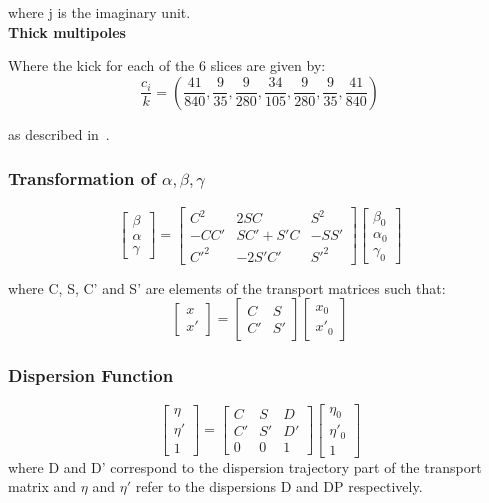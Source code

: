 \documentclass[a4paper]{cernatsnote}
\begin{document}
where j is the imaginary unit.
\\

\textbf{Thick multipoles}

Where the kick for each of the 6 slices are given by:
\[
\frac{c_i}{k} = \left(\frac{41}{840}, \frac{9}{35}, \frac{9}{280},
\frac{34}{105}, \frac{9}{280}, \frac{9}{35}, \frac{41}{840} \right)
\]

as described in~\cite{geo}.

\subsubsection{Transformation of $\alpha, \beta, \gamma$}
\label{ap:beta}
\[
\begin{bmatrix}
\beta \\[0.3em]
\alpha \\[0.3em]
\gamma
\end{bmatrix}
=
\begin{bmatrix}
C^2 & 2SC & S^2 \\[0.3em]
-CC' & SC' + S'C & -SS'\\[0.3em]
C'^2 & -2S'C' & S'^2
\end{bmatrix}
\begin{bmatrix}
\beta_0 \\[0.3em]
\alpha_0 \\[0.3em]
\gamma_0
\end{bmatrix}
\]

where C, S, C' and S' are elements of the transport matrices such
that:
\[
\begin{bmatrix}
x \\[0.3em]
x'
\end{bmatrix}
=
\begin{bmatrix}
C & S \\[0.3em]
C' & S'
\end{bmatrix}
\begin{bmatrix}
x_0 \\[0.3em]
x'_0
\end{bmatrix}
\]

\subsubsection{Dispersion Function}
\label{ap:disp}
\[
\begin{bmatrix}
\eta \\[0.3em]
\eta' \\[0.3em]
1
\end{bmatrix}
=
\begin{bmatrix}
C & S & D \\[0.3em]
C' & S' & D'\\[0.3em]
0 & 0 & 1
\end{bmatrix}
\begin{bmatrix}
\eta_0 \\[0.3em]
\eta'_0 \\[0.3em]
1
\end{bmatrix}
\]
where D and D' correspond to the dispersion trajectory part of the
transport matrix and $\eta$ and $\eta'$ refer to the dispersions D and
DP respectively.
\end{document}
